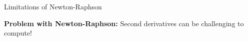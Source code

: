 \documentclass[11pt,compress,t,notes=noshow, xcolor=table]{beamer}
\begin{document}
\begin{vbframe}{Limitations of Newton-Raphson}




\textbf{Problem with Newton-Raphson:} Second derivatives can be challenging to compute! 

\end{vbframe}
\end{document}
